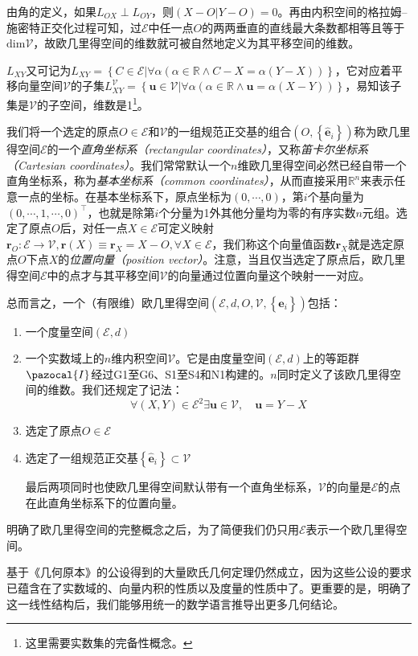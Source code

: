 \documentclass[main.tex]{subfiles}
\begin{document}
由角的定义，如果$L_{OX}\perp L_{OY}$，则$\left(X-O|Y-O\right)=0$。再由内积空间的格拉姆--施密特正交化过程可知，过$\mathcal{E}$中任一点$O$的两两垂直的直线最大条数都相等且等于$\mathrm{dim}\mathcal{V}$，故欧几里得空间的维数就可被自然地定义为其平移空间的维数。

$L_{XY}$又可记为$L_{XY}=\left\{C\in\mathcal{E}|\forall\alpha\left(\alpha\in\mathbb{R}\wedge C-X=\alpha\left(Y-X\right)\right)\right\}$，它对应着平移向量空间$\mathcal{V}$的子集$L^{\mathcal{V}}_{XY}=\left\{\mathbf{u}\in\mathcal{V}|\forall\alpha\left(\alpha\in\mathbb{R}\wedge\mathbf{u}=\alpha\left(X-Y\right)\right)\right\}$，易知该子集是$\mathcal{V}$的子空间，维数是1\footnote{这里需要实数集的完备性概念。}。

我们将一个选定的原点$O\in\mathcal{E}$和$\mathcal{V}$的一组规范正交基的组合$\left(O,\left\{\mathbf{\hat{e}}_i\right\}\right)$称为欧几里得空间$\mathcal{E}$的一个\emph{直角坐标系（rectangular coordinates）}，又称\emph{笛卡尔坐标系（Cartesian coordinates）}。我们常常默认一个$n$维欧几里得空间必然已经自带一个直角坐标系，称为\emph{基本坐标系（common coordinates）}，从而直接采用$\mathbb{R}^n$来表示任意一点的坐标。在基本坐标系下，原点坐标为$\left(0,\cdots,0\right)$，第$i$个基向量为$\left(0,\cdots,1,\cdots,0\right)^\intercal$，也就是除第$i$个分量为1外其他分量均为零的有序实数$n$元组。选定了原点$O$后，对任一点$X\in\mathcal{E}$可定义映射$\mathbf{r}_O:\mathcal{E}\rightarrow\mathcal{V},\mathbf{r}\left(X\right)\equiv\mathbf{r}_X=X-O,\forall X\in\mathcal{E}$，我们称这个向量值函数$\mathbf{r}_X$就是选定原点$O$下点$X$的\emph{位置向量（position vector）}。注意，当且仅当选定了原点后，欧几里得空间$\mathcal{E}$中的点才与其平移空间$\mathcal{V}$的向量通过位置向量这个映射一一对应。

总而言之，一个（有限维）欧几里得空间$\left(\mathcal{E},d,O,\mathcal{V},\left\{\mathbf{\hat{e}}_i\right\}\right)$包括：
\begin{enumerate}
    \item 一个度量空间$\left(\mathcal{E},d\right)$
    \item 一个实数域上的$n$维内积空间$\mathcal{V}$。它是由度量空间$\left(\mathcal{E},d\right)$上的等距群$\pazocal{I}$经过G1至G6、S1至S4和N1构建的。$n$同时定义了该欧几里得空间的维数。我们还规定了记法：
          \[\forall\left(X,Y\right)\in\mathcal{E}^2\exists\mathbf{u}\in\mathcal{V},\quad\mathbf{u}=Y-X\]
    \item 选定了原点$O\in\mathcal{E}$
    \item 选定了一组规范正交基$\left\{\mathbf{\hat{e}}_i\right\}\subset\mathcal{V}$

          最后两项同时也使欧几里得空间默认带有一个直角坐标系，$\mathcal{V}$的向量是$\mathcal{E}$的点在此直角坐标系下的位置向量。
\end{enumerate}

明确了欧几里得空间的完整概念之后，为了简便我们仍只用$\mathcal{E}$表示一个欧几里得空间。

基于《几何原本》的公设得到的大量欧氏几何定理仍然成立，因为这些公设的要求已蕴含在了实数域的、向量内积的性质以及度量的性质中了\cite{Audin2002}。更重要的是，明确了这一线性结构后，我们能够用统一的数学语言推导出更多几何结论\cite{Berger1987}。
\end{document}
